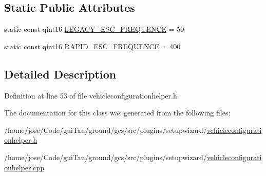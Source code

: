 \subsection*{Static Public Attributes}
\begin{DoxyCompactItemize}
\item 
static const qint16 \hyperlink{group___vehicle_configuration_helper_ga1ab33357e7669d7825cadb88ff666f98}{L\-E\-G\-A\-C\-Y\-\_\-\-E\-S\-C\-\_\-\-F\-R\-E\-Q\-U\-E\-N\-C\-E} = 50
\item 
static const qint16 \hyperlink{group___vehicle_configuration_helper_ga5bdfa86a19f74eae8f6b44ac63d640f2}{R\-A\-P\-I\-D\-\_\-\-E\-S\-C\-\_\-\-F\-R\-E\-Q\-U\-E\-N\-C\-E} = 400
\end{DoxyCompactItemize}


\subsection{Detailed Description}


Definition at line 53 of file vehicleconfigurationhelper.\-h.



The documentation for this class was generated from the following files\-:\begin{DoxyCompactItemize}
\item 
/home/jose/\-Code/gui\-Tau/ground/gcs/src/plugins/setupwizard/\hyperlink{vehicleconfigurationhelper_8h}{vehicleconfigurationhelper.\-h}\item 
/home/jose/\-Code/gui\-Tau/ground/gcs/src/plugins/setupwizard/\hyperlink{vehicleconfigurationhelper_8cpp}{vehicleconfigurationhelper.\-cpp}\end{DoxyCompactItemize}
